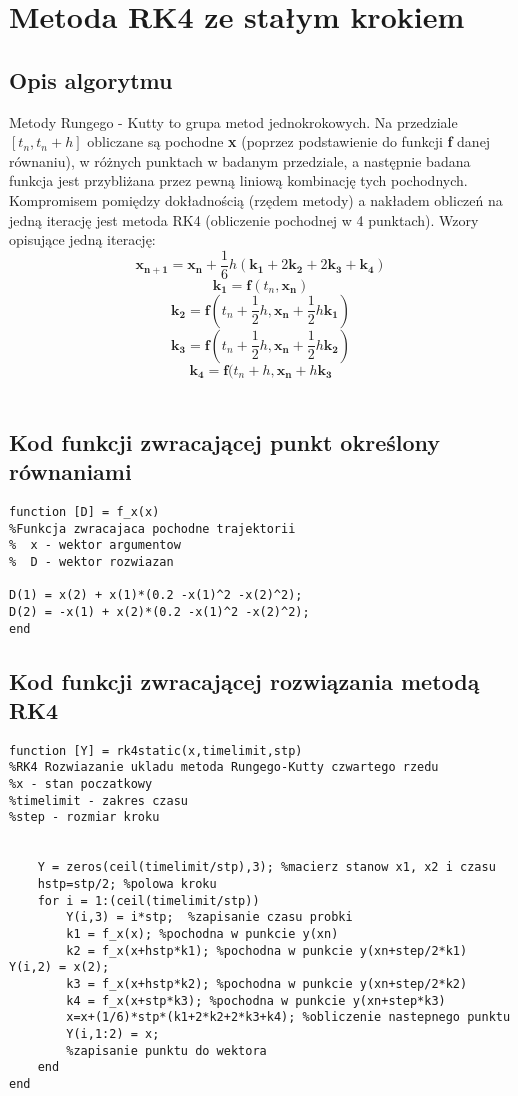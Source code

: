 \documentclass[a4paper, 11pt]{article}
\begin{document}
\section{Metoda RK4 ze stałym krokiem}

\subsection{Opis algorytmu}
Metody Rungego - Kutty to grupa metod jednokrokowych. Na przedziale $[t_{n}, t_{n} + h]$ obliczane są pochodne \textbf{x} (poprzez podstawienie do funkcji \textbf{f} danej równaniu), w różnych punktach w badanym przedziale, a następnie badana funkcja jest przybliżana przez pewną liniową kombinację tych pochodnych. Kompromisem pomiędzy dokładnością (rzędem metody) a nakładem obliczeń na jedną iterację jest metoda RK4 (obliczenie pochodnej w 4 punktach). Wzory opisujące jedną iterację:
$$ \mathbf{x_{n+1}} = \mathbf{x_{n}} + \frac{1}{6}h(\mathbf{k_{1}} + 2\mathbf{k_{2}} + 2\mathbf{k_{3}} + \mathbf{k_{4}})$$
$$\mathbf{k_{1}} = \mathbf{f}(t_{n}, \mathbf{x_{n}})$$
$$\mathbf{k_{2}} = \mathbf{f}(t_{n}+\frac{1}{2}h, \mathbf{x_{n}} + \frac{1}{2}h\mathbf{k_{1}})$$
$$\mathbf{k_{3}} = \mathbf{f}(t_{n}+\frac{1}{2}h, \mathbf{x_{n}} + \frac{1}{2}h\mathbf{k_{2}})$$
$$\mathbf{k_{4}} = \mathbf{f}(t_{n}+h, \mathbf{x_{n}} + h\mathbf{k_{3}}$$\\



\subsection{Kod funkcji zwracającej punkt określony równaniami}
\begin{lstlisting}
function [D] = f_x(x)
%Funkcja zwracajaca pochodne trajektorii 
%  x - wektor argumentow 
%  D - wektor rozwiazan

D(1) = x(2) + x(1)*(0.2 -x(1)^2 -x(2)^2); 
D(2) = -x(1) + x(2)*(0.2 -x(1)^2 -x(2)^2);
end
\end{lstlisting}
\hspace{5cm}
\subsection{Kod funkcji zwracającej rozwiązania metodą RK4}
\begin{lstlisting}
function [Y] = rk4static(x,timelimit,stp)
%RK4 Rozwiazanie ukladu metoda Rungego-Kutty czwartego rzedu
%x - stan poczatkowy
%timelimit - zakres czasu
%step - rozmiar kroku


    Y = zeros(ceil(timelimit/stp),3); %macierz stanow x1, x2 i czasu
    hstp=stp/2; %polowa kroku
    for i = 1:(ceil(timelimit/stp))
        Y(i,3) = i*stp;  %zapisanie czasu probki
        k1 = f_x(x); %pochodna w punkcie y(xn)
        k2 = f_x(x+hstp*k1); %pochodna w punkcie y(xn+step/2*k1)        Y(i,2) = x(2);
        k3 = f_x(x+hstp*k2); %pochodna w punkcie y(xn+step/2*k2)
        k4 = f_x(x+stp*k3); %pochodna w punkcie y(xn+step*k3)
        x=x+(1/6)*stp*(k1+2*k2+2*k3+k4); %obliczenie nastepnego punktu
        Y(i,1:2) = x;  
        %zapisanie punktu do wektora
    end
end
\end{lstlisting}
\end{document}
